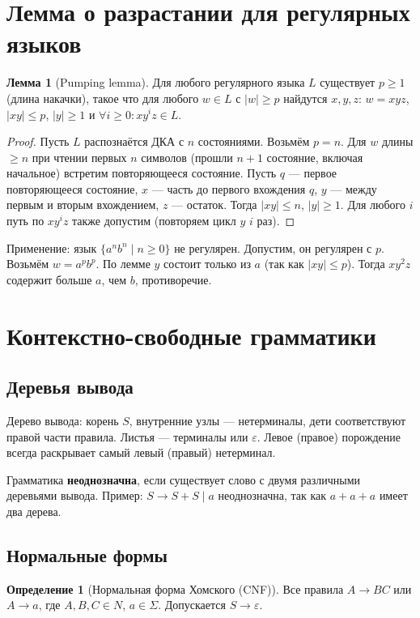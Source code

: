 \documentclass[12pt,a4paper]{article}
\theoremstyle{definition}
\newtheorem{definition}{Определение}[section]
\newtheorem{lemma}{Лемма}[section]
\newcommand{\emptystring}{\varepsilon}
\begin{document}
\section{Лемма о разрастании для регулярных языков}\label{sec:pumping-reg}
\begin{lemma}[Pumping lemma]
Для любого регулярного языка $L$ существует $p\ge 1$ (длина накачки), такое что для любого $w\in L$ с $|w|\ge p$ найдутся $x,y,z$: $w=xyz$, $|xy|\le p$, $|y|\ge 1$ и $\forall i\ge0: xy^iz\in L$.
\end{lemma}

\begin{proof}
Пусть $L$ распознаётся ДКА с $n$ состояниями. Возьмём $p=n$. Для $w$ длины $\ge n$ при чтении первых $n$ символов (прошли $n+1$ состояние, включая начальное) встретим повторяющееся состояние. Пусть $q$ --- первое повторяющееся состояние, $x$ --- часть до первого вхождения $q$, $y$ --- между первым и вторым вхождением, $z$ --- остаток. Тогда $|xy|\le n$, $|y|\ge1$. Для любого $i$ путь по $xy^iz$ также допустим (повторяем цикл $y$ $i$ раз).
\end{proof}

Применение: язык $\{a^n b^n \mid n\ge0\}$ не регулярен. Допустим, он регулярен с $p$. Возьмём $w=a^p b^p$. По лемме $y$ состоит только из $a$ (так как $|xy|\le p$). Тогда $xy^2z$ содержит больше $a$, чем $b$, противоречие.

\section{Контекстно-свободные грамматики}

\subsection{Деревья вывода}
Дерево вывода: корень $S$, внутренние узлы --- нетерминалы, дети соответствуют правой части правила. Листья --- терминалы или $\emptystring$. Левое (правое) порождение всегда раскрывает самый левый (правый) нетерминал.

Грамматика \textbf{неоднозначна}, если существует слово с двумя различными деревьями вывода. Пример: $S\to S+S\mid a$ неоднозначна, так как $a+a+a$ имеет два дерева.

\subsection{Нормальные формы}

\begin{definition}[Нормальная форма Хомского (CNF)]
Все правила $A\to BC$ или $A\to a$, где $A,B,C\in N$, $a\in\Sigma$. Допускается $S\to\emptystring$.
\end{definition}
\end{document}
